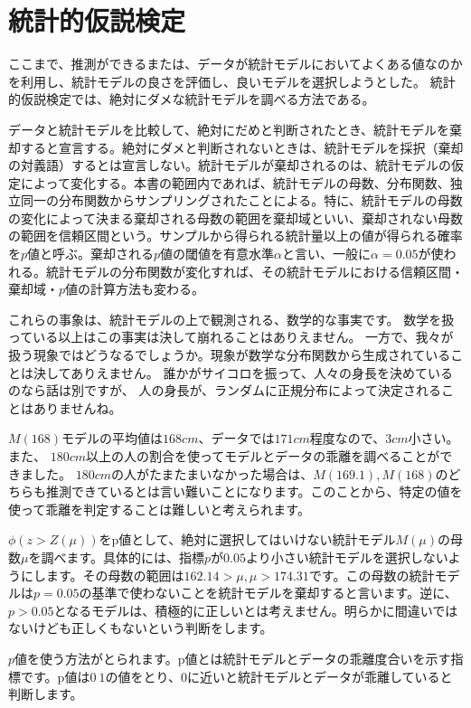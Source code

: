 
\section{統計的仮説検定}
ここまで、推測ができるまたは、データが統計モデルにおいてよくある値なのかを利用し、統計モデルの良さを評価し、良いモデルを選択しようとした。
統計的仮説検定では、絶対にダメな統計モデルを調べる方法である。
\begin{defi}
    データと統計モデルを比較して、絶対にだめと判断されたとき、統計モデルを棄却すると宣言する。絶対にダメと判断されないときは、統計モデルを採択（棄却の対義語）するとは宣言しない。統計モデルが棄却されるのは、統計モデルの仮定によって変化する。本書の範囲内であれば、統計モデルの母数、分布関数、独立同一の分布関数からサンプリングされたことによる。特に、統計モデルの母数の変化によって決まる棄却される母数の範囲を棄却域といい、棄却されない母数の範囲を信頼区間という。サンプルから得られる統計量以上の値が得られる確率を$p$値と呼ぶ。棄却される$p$値の閾値を有意水準$\alpha$と言い、一般に$\alpha=0.05$が使われる。統計モデルの分布関数が変化すれば、その統計モデルにおける信頼区間・棄却域・$p$値の計算方法も変わる。
\end{defi}

これらの事象は、統計モデルの上で観測される、数学的な事実です。
数学を扱っている以上はこの事実は決して崩れることはありえません。
一方で、我々が扱う現象ではどうなるでしょうか。現象が数学な分布関数から生成されていることは決してありえません。
誰かがサイコロを振って、人々の身長を決めているのなら話は別ですが、
人の身長が、ランダムに正規分布によって決定されることはありませんね。

$M(168)$モデルの平均値は$168cm$、データでは$171cm$程度なので、$3cm$小さい。また、
$180cm$以上の人の割合を使ってモデルとデータの乖離を調べることができました。
$180cm$の人がたまたまいなかった場合は、$M(169.1),M(168)$のどちらも推測できているとは言い難いことになります。このことから、特定の値を使って乖離を判定することは難しいと考えられます。


$\phi(z>Z(\mu))を$p値として、絶対に選択してはいけない統計モデル$M(\mu)$の母数$\mu$を調べます。具体的には、指標$p$が$0.05$より小さい統計モデルを選択しないようにします。その母数の範囲は$162.14 >\mu, \mu > 174.31$です。この母数の統計モデルは$p=0.05$の基準で使わないことを統計モデルを棄却すると言います。逆に、$p>0.05$となるモデルは、積極的に正しいとは考えません。明らかに間違いではないけども正しくもないという判断をします。


$p$値を使う方法がとられます。p値とは統計モデルとデータの乖離度合いを示す指標です。p値は$0~1$の値をとり、$0$に近いと統計モデルとデータが乖離していると判断します。
\fi 

